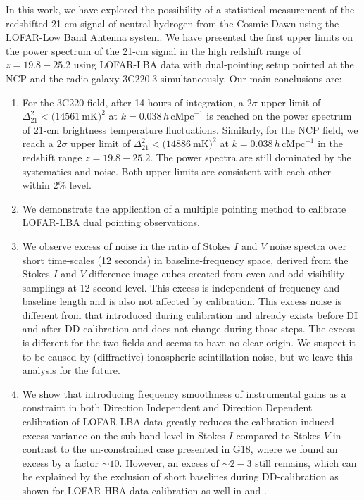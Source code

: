\documentclass[fleqn,usenatbib]{mnras}
\begin{document}
In this work, we have explored the possibility of a statistical measurement of the redshifted 21-cm signal of neutral hydrogen from the Cosmic Dawn using the LOFAR-Low Band Antenna system. We have presented the first upper limits on the power spectrum of the 21-cm signal in the high redshift range of $z = 19.8 - 25.2$ using LOFAR-LBA data with dual-pointing setup pointed at the NCP and the  radio galaxy 3C220.3 simultaneously. Our main conclusions are:
\begin{enumerate}

\item For the 3C220 field, after 14 hours of integration, a $2\sigma$ upper limit of $\Delta_{21}^2 < (14561 \ \text{mK)}^2$ at $k = 0.038\,h\,\text{cMpc}^{-1}$ is reached on the power spectrum of 21-cm brightness temperature fluctuations. Similarly, for the NCP field, we reach a $2\sigma$ upper limit of $\Delta_{21}^2 < (14886 \ \text{mK)}^2$ at $k = 0.038 \,h\,\text{cMpc}^{-1}$ in the redshift range $z = 19.8 - 25.2$. The power spectra are still dominated by the systematics and noise. Both upper limits are consistent with each other within $2\%$ level.

\item We demonstrate the application of a multiple pointing method to calibrate LOFAR-LBA dual pointing observations. 

\item We observe excess of noise in the ratio of Stokes $I$ and $V$ noise spectra over short time-scales (12 seconds) in baseline-frequency space, derived from the Stokes $I$ and $V$ difference image-cubes created from even and odd visibility samplings at 12 second level. This excess is independent of frequency and baseline length and is also not affected by calibration. This excess noise is different from that introduced during calibration and already exists before DI and after DD calibration and does not change during those steps. The excess is different for the two fields and seems to have no clear origin. We suspect it to be caused by (diffractive) ionospheric scintillation noise, but we leave this analysis for the future.   

\item We show that introducing frequency smoothness of instrumental gains as a constraint in both Direction Independent and Direction Dependent calibration of LOFAR-LBA data greatly reduces the calibration induced excess variance on the sub-band level in Stokes $I$ compared to Stokes $V$ in contrast to the un-constrained case presented in G18, where we found an excess by a factor $\sim 10$. However, an excess of $\sim 2 - 3$ still remains, which can be explained by the exclusion of short baselines during DD-calibration as shown for LOFAR-HBA data calibration as well in \cite{patil2016} and \cite{sardarabadi2018}. 


\end{enumerate}
\end{document}
